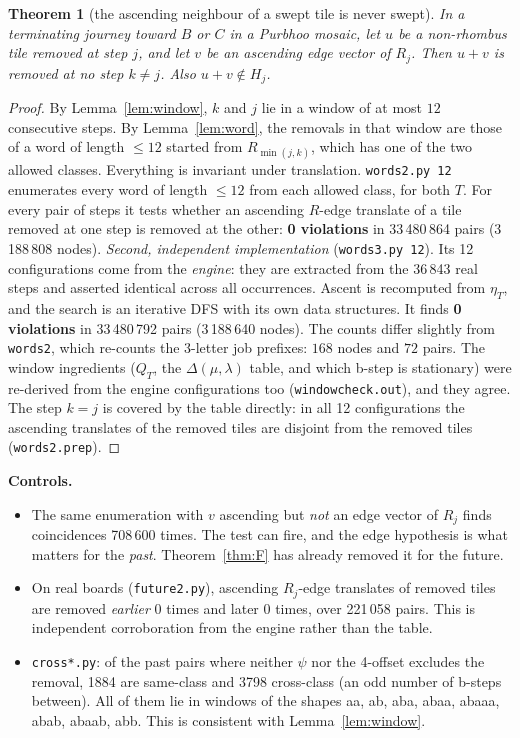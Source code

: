\documentclass[11pt]{article}
\newtheorem{theorem}{Theorem}\newtheorem{lemma}[theorem]{Lemma}\newtheorem{proposition}[theorem]{Proposition}
\theoremstyle{definition}\newtheorem{definition}[theorem]{Definition}\newtheorem{remark}[theorem]{Remark}
\begin{document}
\begin{theorem}[the ascending neighbour of a swept tile is never swept]\label{thm:AW}
In a terminating journey toward $B$ or $C$ in a Purbhoo mosaic, let $u$ be a non-rhombus tile removed at step $j$, and let $v$ be an ascending edge vector of $R_j$. Then $u+v$ is removed at no step $k\neq j$. Also $u+v\notin H_j$.
\end{theorem}
\begin{proof}
By Lemma~\ref{lem:window}, $k$ and $j$ lie in a window of at most $12$ consecutive steps. By Lemma~\ref{lem:word}, the removals in that window are those of a word of length $\le12$ started from $R_{\min(j,k)}$, which has one of the two allowed classes. Everything is invariant under translation.
\texttt{words2.py 12} enumerates every word of length $\le12$ from each allowed class, for both $T$. For every pair of steps it tests whether an ascending $R$-edge translate of a tile removed at one step is removed at the other: \textbf{0 violations} in 33\,480\,864 pairs (3\,188\,808 nodes).
\emph{Second, independent implementation} (\texttt{words3.py 12}). Its 12 configurations come from the \emph{engine}: they are extracted from the 36\,843 real steps and asserted identical across all occurrences. Ascent is recomputed from $\eta_T$, and the search is an iterative DFS with its own data structures. It finds \textbf{0 violations} in 33\,480\,792 pairs (3\,188\,640 nodes).
The counts differ slightly from \texttt{words2}, which re-counts the 3-letter job prefixes: $168$ nodes and $72$ pairs.
The window ingredients ($Q_T$, the $\Delta(\mu,\lambda)$ table, and which b-step is stationary) were re-derived from the engine configurations too (\texttt{windowcheck.out}), and they agree.
The step $k=j$ is covered by the table directly: in all 12 configurations the ascending translates of the removed tiles are disjoint from the removed tiles (\texttt{words2.prep}).
\end{proof}
\noindent\textbf{Controls.}
\begin{itemize}
\item The same enumeration with $v$ ascending but \emph{not} an edge vector of $R_j$ finds coincidences 708\,600 times. The test can fire, and the edge hypothesis is what matters for the \emph{past}. Theorem~\ref{thm:F} has already removed it for the future.
\item On real boards (\texttt{future2.py}), ascending $R_j$-edge translates of removed tiles are removed \emph{earlier} 0 times and later 0 times, over 221\,058 pairs. This is independent corroboration from the engine rather than the table.
\item \texttt{cross*.py}: of the past pairs where neither $\psi$ nor the 4-offset excludes the removal, 1884 are same-class and 3798 cross-class (an odd number of b-steps between). All of them lie in windows of the shapes aa, ab, aba, abaa, abaaa, abab, abaab, abb. This is consistent with Lemma~\ref{lem:window}.
\end{itemize}
\end{document}
